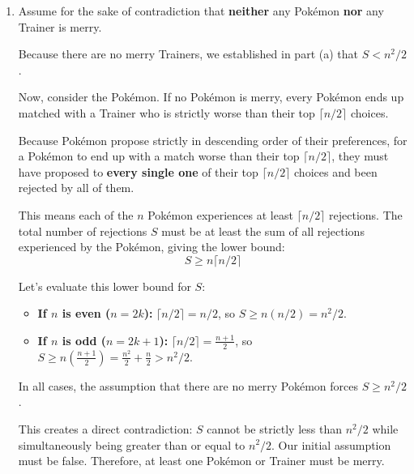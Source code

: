 \documentclass[11pt]{article}
\begin{document}
\begin{enumerate}[label=\textbf{(\alph*)}]
    \item Assume for the sake of contradiction that \textbf{neither} any Pokémon \textbf{nor} any Trainer is merry.
    
    Because there are no merry Trainers, we established in part (a) that $S < n^2/2$.
    
    Now, consider the Pokémon. If no Pokémon is merry, every Pokémon ends up matched with a Trainer who is strictly worse than their top $\lceil n/2 \rceil$ choices. 
    
    Because Pokémon propose strictly in descending order of their preferences, for a Pokémon to end up with a match worse than their top $\lceil n/2 \rceil$, they must have proposed to \textbf{every single one} of their top $\lceil n/2 \rceil$ choices and been rejected by all of them.
    
    This means each of the $n$ Pokémon experiences at least $\lceil n/2 \rceil$ rejections. The total number of rejections $S$ must be at least the sum of all rejections experienced by the Pokémon, giving the lower bound:
    $$S \ge n \lceil n/2 \rceil$$
    
    Let's evaluate this lower bound for $S$:
    \begin{itemize}
        \item \textbf{If $n$ is even ($n=2k$):} $\lceil n/2 \rceil = n/2$, so $S \ge n(n/2) = n^2/2$.
        \item \textbf{If $n$ is odd ($n=2k+1$):} $\lceil n/2 \rceil = \frac{n+1}{2}$, so $S \ge n\left(\frac{n+1}{2}\right) = \frac{n^2}{2} + \frac{n}{2} > n^2/2$.
    \end{itemize}
    
    In all cases, the assumption that there are no merry Pokémon forces $S \ge n^2/2$.
    
    This creates a direct contradiction: $S$ cannot be strictly less than $n^2/2$ while simultaneously being greater than or equal to $n^2/2$. Our initial assumption must be false. Therefore, at least one Pokémon or Trainer must be merry.
\end{enumerate}
\end{document}
